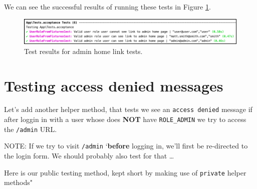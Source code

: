 \documentclass[a4paperpaper,openright]{book}
\newenvironment{Shaded}{}{}
\newcommand{\AnnotationTok}[1]{\textcolor[rgb]{0.38,0.63,0.69}{\textbf{\textit{#1}}}}
\newcommand{\CommentTok}[1]{\textcolor[rgb]{0.38,0.63,0.69}{\textit{#1}}}
\newcommand{\CommentVarTok}[1]{\textcolor[rgb]{0.38,0.63,0.69}{\textbf{\textit{#1}}}}
\newcommand{\KeywordTok}[1]{\textcolor[rgb]{0.00,0.44,0.13}{\textbf{#1}}}
\newcommand{\NormalTok}[1]{#1}
\newcommand{\OtherTok}[1]{\textcolor[rgb]{0.00,0.44,0.13}{#1}}
\newcommand{\StringTok}[1]{\textcolor[rgb]{0.25,0.44,0.63}{#1}}
\begin{document}
We can see the successful results of running these tests in Figure
\ref{linkTests}.

\begin{figure}
\centering
\includegraphics{./tex2pdf.-d01fd108a306454d/5fd12dfb913b1a7298d322573cd58c01f6026a1e.png}
\caption{Test results for admin home link tests.\label{linkTests}}
\end{figure}

\hypertarget{testing-access-denied-messages}{%
\section{Testing access denied
messages}\label{testing-access-denied-messages}}

Let's add another helper method, that tests we see an
\texttt{access\ denied} message if after loggin in with a user whose
does \textbf{NOT} have \texttt{ROLE\_ADMIN} we try to access the
\texttt{/admin} URL.

NOTE: If we try to visit \texttt{/admin} `\textbf{before} logging in,
we'll first be re-directed to the login form. We should probably also
test for that \ldots{}

Here is our public testing method, kept short by making use of
\texttt{private} helper methods"

\begin{Shaded}
\end{Shaded}
\end{document}
